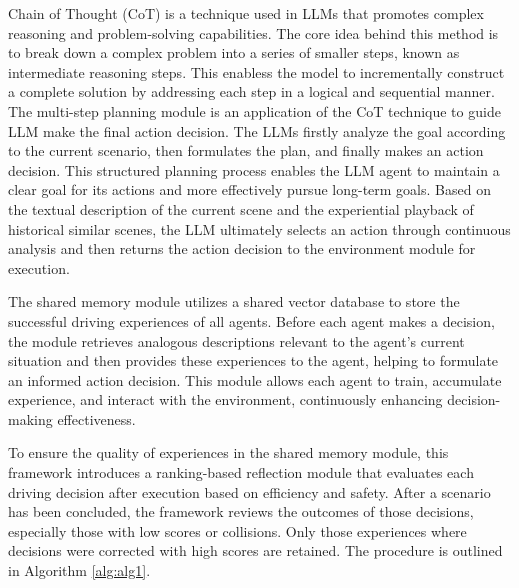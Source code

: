 \documentclass[lettersize,journal]{IEEEtran}
\begin{document}
Chain of Thought (CoT) is a technique used in LLMs that promotes complex reasoning and problem-solving capabilities. The core idea behind this method is to break down a complex problem into a series of smaller steps, known as intermediate reasoning steps. This enabless the model to incrementally construct a complete solution by addressing each step in a logical and sequential manner\cite{wei2022chain,lyu2023faithful,zhangmultimodal}. The multi-step planning module is an application of the CoT technique to guide LLM make the final action decision. The LLMs firstly analyze the goal according to the current scenario, then formulates the plan, and finally makes an action decision. This structured planning process enables the LLM agent to maintain a clear goal for its actions and more effectively pursue long-term goals. Based on the textual description of the current scene and the experiential playback of historical similar scenes, the LLM ultimately selects an action through continuous analysis and then returns the action decision to the environment module for execution.

The shared memory module utilizes a shared vector database to store the successful driving experiences of all agents. Before each agent makes a decision, the module retrieves analogous descriptions relevant to the agent's current situation and then provides these experiences to the agent, helping to formulate an informed action decision. This module allows each agent to train, accumulate experience, and interact with the environment, continuously enhancing decision-making effectiveness.

To ensure the quality of experiences in the shared memory module, this framework introduces a ranking-based reflection module that evaluates each driving decision after execution based on efficiency and safety. After a scenario has been concluded, the framework reviews the outcomes of those decisions, especially those with low scores or collisions. Only those experiences where decisions were corrected with high scores are retained. The procedure is outlined in Algorithm \ref{alg:alg1}.
\end{document}
